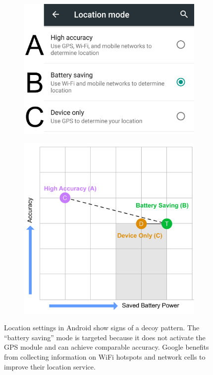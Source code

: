 \begin{figure}
	\centering
	\begin{subfigure}[!t]{0.49\textwidth}
		\includegraphics[width=\textwidth]{figures/decoy/Android_Location_Decoy}
	\end{subfigure}
	\begin{subfigure}[!t]{0.49\textwidth}
		\includegraphics[width=\textwidth]{figures/decoy/decoy-dimensions-android}
	\end{subfigure}
	\caption{\label{fig:decoy:android-pattern}Location settings in Android show signs of a decoy pattern. The ``battery saving'' mode is targeted because it does not activate the GPS module and can achieve comparable accuracy. Google benefits from collecting information on WiFi hotspots and network cells to improve their location service.} 
\end{figure}


